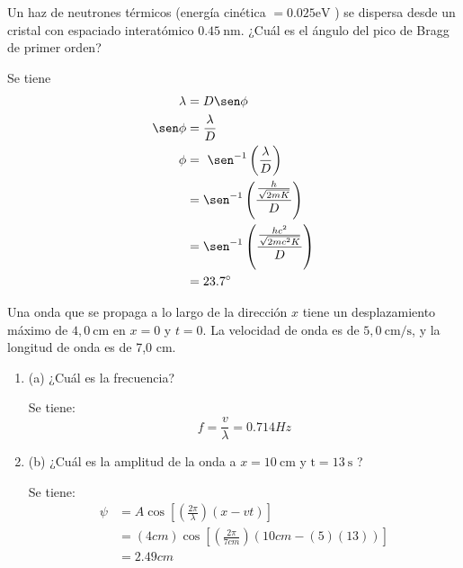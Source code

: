 \begin{problema}
    Un haz de neutrones térmicos (energía cinética $=0.025 \mathrm{eV}$ ) se dispersa desde un cristal con espaciado interatómico $0.45 \mathrm{~nm}$. ¿Cuál es el ángulo del pico de Bragg de primer orden?
    \begin{sol}
        Se tiene 
        \begin{align*}
            \lambda &= D\sen \phi\\
            \sen\phi &= \frac{\lambda}{D}\\
            \phi &= \sen ^{-1}\left(\frac{\lambda}{D}\right)\\
            &= \sen ^{-1}\left(\frac{\frac{h}{\sqrt{2mK}}}{D}\right)\\
            &= \sen ^{-1}\left(\frac{\frac{hc^2}{\sqrt{2mc^2K}}}{D}\right)\\
            &= 23.7^{\circ}
        \end{align*}
    \end{sol}
\end{problema}

\begin{problema}
    Una onda que se propaga a lo largo de la dirección $x$ tiene un desplazamiento máximo de $4,0 \mathrm{~cm}$ en $x=0$ y $t=0$. La velocidad de onda es de $5,0 \mathrm{~cm} / \mathrm{s}$, y la longitud de onda es de 7,0 cm. 
    \begin{enumerate}
        \item (a) ¿Cuál es la frecuencia? 
        \begin{sol}
            Se tiene:
            $$f=\frac{v}{\lambda}=0.714 Hz$$
        \end{sol}
        \item (b) ¿Cuál es la amplitud de la onda a $x=10 \mathrm{~cm}$ y $\mathrm{t}=13 \mathrm{~s}$ ?
        \begin{sol}
            Se tiene: 
            \begin{align*}
                \psi &= A\cos\left[\left(\frac{2\pi}{\lambda}\right)(x-vt)\right]\\
                &= (4cm)\cos\left[\left(\frac{2\pi}{7cm}\right)(10cm-(5)(13))\right]\\
                &= 2.49 cm
            \end{align*}
        \end{sol}
    \end{enumerate}
    
\end{problema}

